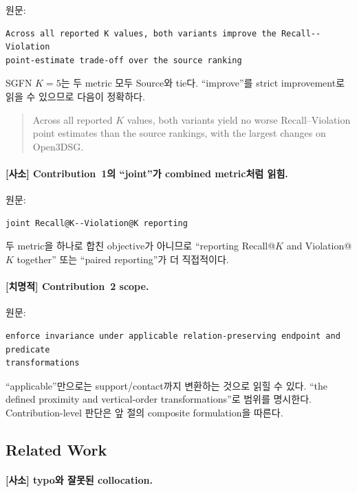 \documentclass[11pt]{article}
\newcommand{\fatal}{\textbf{\textcolor{fatalred}{[치명적]}}}
\newcommand{\minor}{\textbf{\textcolor{minorblue}{[사소]}}}
\begin{document}
원문:
\begin{verbatim}
Across all reported K values, both variants improve the Recall--Violation
point-estimate trade-off over the source ranking
\end{verbatim}

SGFN $K=5$는 두 metric 모두 Source와 tie다. ``improve''를 strict improvement로
읽을 수 있으므로 다음이 정확하다.

\begin{quote}
Across all reported $K$ values, both variants yield no worse Recall--Violation
point estimates than the source rankings, with the largest changes on Open3DSG.
\end{quote}

\paragraph{\minor{} Contribution~1의 ``joint''가 combined metric처럼 읽힘.}

원문:
\begin{verbatim}
joint Recall@K--Violation@K reporting
\end{verbatim}

두 metric을 하나로 합친 objective가 아니므로 ``reporting Recall@$K$ and
Violation@$K$ together'' 또는 ``paired reporting''가 더 직접적이다.

\paragraph{\fatal{} Contribution~2 scope.}

원문:
\begin{verbatim}
enforce invariance under applicable relation-preserving endpoint and predicate
transformations
\end{verbatim}

``applicable''만으로는 support/contact까지 변환하는 것으로 읽힐 수 있다.
``the defined proximity and vertical-order transformations''로 범위를 명시한다.
Contribution-level 판단은 앞 절의 composite formulation을 따른다.

\subsection{Related Work}

\paragraph{\minor{} typo와 잘못된 collocation.}
\end{document}
